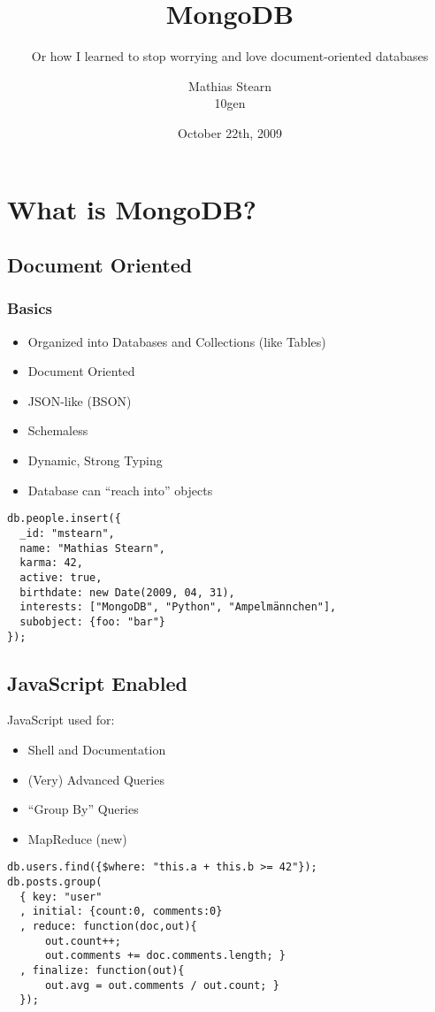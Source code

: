 \documentclass{beamer}
\title{MongoDB}
\subtitle{Or how I learned to stop worrying and love document-oriented databases}
\author{Mathias Stearn \\ 10gen}
\date{October 22th, 2009}
\begin{document}
\frame{\titlepage}

\section[Outline]{}
\frame{\tableofcontents}

\section{What is MongoDB?}
\subsection{Document Oriented}
\begin{frame}[fragile]
  \frametitle{Basics}

  \begin{itemize}
    \item Organized into Databases and Collections (like Tables)
    \item Document Oriented
    \item JSON-like (BSON)
    \item Schemaless
    \item Dynamic, Strong Typing
    \item Database can ``reach into'' objects
  \end{itemize}

  \begin{small}
  \begin{verbatim}
db.people.insert({
  _id: "mstearn",
  name: "Mathias Stearn",
  karma: 42,
  active: true,
  birthdate: new Date(2009, 04, 31),
  interests: ["MongoDB", "Python", "Ampelmännchen"],
  subobject: {foo: "bar"}
});
  \end{verbatim}
  \end{small}

\end{frame}

\subsection{JavaScript Enabled}
\begin{frame}[fragile]
  JavaScript used for:
  \begin{itemize}
    \item Shell and Documentation
    \item (Very) Advanced Queries
    \item ``Group By'' Queries
    \item MapReduce (new)
  \end{itemize}

  \begin{verbatim}
db.users.find({$where: "this.a + this.b >= 42"});
db.posts.group(
  { key: "user"
  , initial: {count:0, comments:0}
  , reduce: function(doc,out){
      out.count++;
      out.comments += doc.comments.length; }
  , finalize: function(out){ 
      out.avg = out.comments / out.count; }
  });
  \end{verbatim}
\end{frame}
\end{document}
